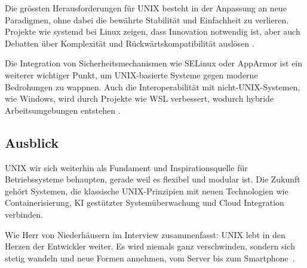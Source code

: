 Die grössten Herausforderungen für UNIX besteht in der Anpassung an neue Paradigmen, ohne dabei die bewährte Stabilität und Einfachheit zu verlieren. Projekte wie
systemd bei Linux zeigen, dass Innovation notwendig ist, aber auch Debatten über Komplexität und Rückwärtskompatibilität auslösen \cite{ArtOfUnixProgramming, ModernOS}.

Die Integration von Sicherheitsmechanismen wie SELinux oder AppArmor ist ein weiterer wichtiger Punkt, um UNIX-basierte Systeme gegen moderne Bedrohungen zu wappnen.
Auch die Interoperabilität mit nicht-UNIX-Systemen, wie Windows, wird durch Projekte wie WSL verbessert, wodurch hybride Arbeitsumgebungen entstehen \cite{WSL, interviewNH}.


\subsection{Ausblick}

UNIX wir sich weiterhin als Fundament und Inspirationsquelle für Betriebssysteme behaupten, gerade weil es flexibel und modular ist. Die Zukunft gehört Systemen,
die klassische UNIX-Prinzipien mit neuen Technologien wie Containerisierung, KI gestützter Systemüberwachung und Cloud Integration verbinden.

Wie Herr von Niederhäusern im Interview zusammenfasst: \glqq UNIX lebt in den Herzen der Entwickler weiter. Es wird niemals ganz verschwinden, sondern sich stetig
wandeln und neue Formen annehmen, vom Server bis zum Smartphone\grqq \ \cite{interviewNH}.